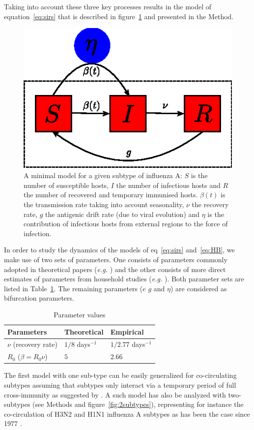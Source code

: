 \documentclass[12pt]{article}
\begin{document}
Taking into account these three key processes results in the model of
equation~\eqref{eq:sirs} that is described in figure~\ref{fig:sirs}
and presented in the Method.


\begin{figure}[htb]
  \center
  \includegraphics[width= 0.3 \linewidth]{graph/sirs.eps}
  \caption{A minimal model for a given subtype of influenza A: $S$ is
    the number of susceptible hosts, $I$ the number of infectious
    hosts and $R$ the number of recovered and temporary immunised
    hosts. $\beta(t)$ is the transmission rate taking into account
    seasonality, $\nu$ the recovery rate, $g$ the antigenic drift rate
    (due to viral evolution) and $\eta$ is the contribution of
    infectious hosts from external regions to the force of infection.}
  \label{fig:sirs}
\end{figure}

In order to study the dynamics of the models of eq~\eqref{eq:sirs}
and~\eqref{eq:HB}, we make use of two sets of parameters. One consists
of parameters commonly adopted in theoretical papers (\textit{e.g.}
\citet{Koelle2006, Ferguson2003, Goekaydin2007}) and the other
consists of more direct estimates of parameters from household studies
(\textit{e.g.} \citet{Cauchemez2004, Lavenu2004, Ferguson2005}). Both
parameter sets are listed in Table~\ref{tab:param}.  The remaining
parameters ($e$ $g$ and $\eta$) are considered as bifurcation
parameters.

\begin{table}[htb]
  \center
  \begin{tabular}{|l|l|l|}
    \hline
    Parameters & Theoretical & Empirical\\
    \hline
    $\nu$ (recovery rate) & $1/8$ days$^{-1}$ \citep{Koelle2006} & $1/2.77$ days$^{-1}$ \citep{Lavenu2004} \\
    \hline	
    $R_0$ ($\beta=R_0 \nu$) & $5$ \citep{Koelle2006} & $2.66$ \citep{Lavenu2004} \\
    \hline		
  \end{tabular}
  \caption{Parameter values}
  \label{tab:param}
\end{table}

The first model with one sub-type can be easily generalized for
co-circulating subtypes assuming that subtypes only interact via a
temporary period of full cross-immunity as suggested by
\citet{Webster1992}. A such model has also be analyzed with
two-subtypes (see Methods and figure~\ref{fig:2subtypes}),
representing for instance the co-circulation of H3N2 and H1N1
influenza A subtypes as has been the case since 1977 \citep{Earn2002}.
\end{document}
